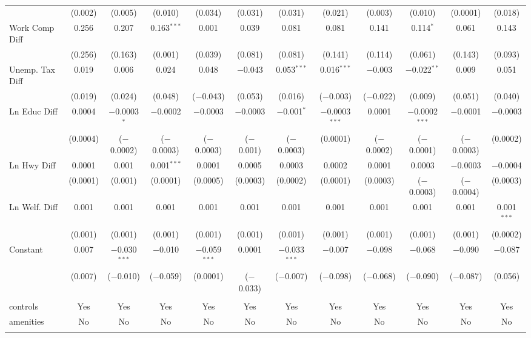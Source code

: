 \begin{table}[!htbp]
\begin{tabular}{@{\extracolsep{5pt}}lccccccccccc}
  & (0.002) & (0.005) & (0.010) & (0.034) & (0.031) & (0.031) & (0.021) & (0.003) & (0.010) & (0.0001) & (0.018) \\ 
  Work Comp Diff & 0.256 & 0.207 & 0.163$^{***}$ & 0.001 & 0.039 & 0.081 & 0.081 & 0.141 & 0.114$^{*}$ & 0.061 & 0.143 \\ 
  & (0.256) & (0.163) & (0.001) & (0.039) & (0.081) & (0.081) & (0.141) & (0.114) & (0.061) & (0.143) & (0.093) \\ 
  Unemp. Tax Diff & 0.019 & 0.006 & 0.024 & 0.048 & $-$0.043 & 0.053$^{***}$ & 0.016$^{***}$ & $-$0.003 & $-$0.022$^{**}$ & 0.009 & 0.051 \\ 
  & (0.019) & (0.024) & (0.048) & ($-$0.043) & (0.053) & (0.016) & ($-$0.003) & ($-$0.022) & (0.009) & (0.051) & (0.040) \\ 
  Ln Educ Diff & 0.0004 & $-$0.0003$^{*}$ & $-$0.0002 & $-$0.0003 & $-$0.0003 & $-$0.001$^{*}$ & $-$0.0003$^{***}$ & 0.0001 & $-$0.0002$^{***}$ & $-$0.0001 & $-$0.0003 \\ 
  & (0.0004) & ($-$0.0002) & ($-$0.0003) & ($-$0.0003) & ($-$0.001) & ($-$0.0003) & (0.0001) & ($-$0.0002) & ($-$0.0001) & ($-$0.0003) & (0.0002) \\ 
  Ln Hwy Diff & 0.0001 & 0.001 & 0.001$^{***}$ & 0.0001 & 0.0005 & 0.0003 & 0.0002 & 0.0001 & 0.0003 & $-$0.0003 & $-$0.0004 \\ 
  & (0.0001) & (0.001) & (0.0001) & (0.0005) & (0.0003) & (0.0002) & (0.0001) & (0.0003) & ($-$0.0003) & ($-$0.0004) & (0.0003) \\ 
  Ln Welf. Diff & 0.001 & 0.001 & 0.001 & 0.001 & 0.001 & 0.001 & 0.001 & 0.001 & 0.001 & 0.001 & 0.001$^{***}$ \\ 
  & (0.001) & (0.001) & (0.001) & (0.001) & (0.001) & (0.001) & (0.001) & (0.001) & (0.001) & (0.001) & (0.0002) \\ 
  Constant & 0.007 & $-$0.030$^{***}$ & $-$0.010 & $-$0.059$^{***}$ & 0.0001 & $-$0.033$^{***}$ & $-$0.007 & $-$0.098 & $-$0.068 & $-$0.090 & $-$0.087 \\ 
  & (0.007) & ($-$0.010) & ($-$0.059) & (0.0001) & ($-$0.033) & ($-$0.007) & ($-$0.098) & ($-$0.068) & ($-$0.090) & ($-$0.087) & (0.056) \\ 
 \hline \\[-1.8ex] 
controls & Yes & Yes & Yes & Yes & Yes & Yes & Yes & Yes & Yes & Yes & Yes \\ 
amenities & No & No & No & No & No & No & No & No & No & No & No \\ 
\hline \\[-1.8ex] 

\end{tabular}
\end{table}
